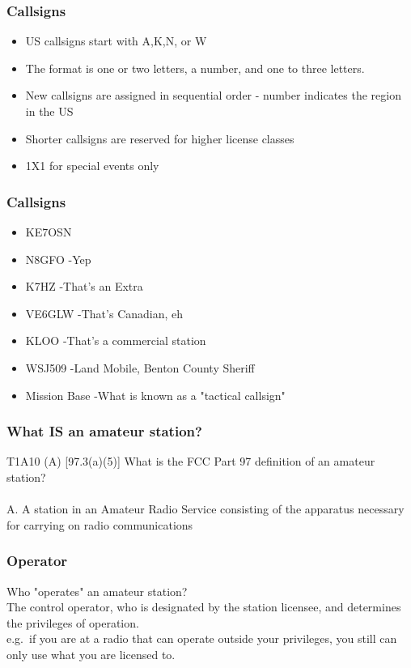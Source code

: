 \documentclass[10pt]{beamer}
\begin{document}
\begin{frame}
\frametitle{Callsigns}
\begin{itemize}
\item US callsigns start with A,K,N, or W
\item The format is one or two letters, a number, and one to three letters.
\item New callsigns are assigned in sequential order - number indicates the region in the US
\item Shorter callsigns are reserved for higher license classes
\item 1X1 for special events only
\end{itemize}
\end{frame}

\begin{frame}
\frametitle{Callsigns}
\begin{itemize}
\item KE7OSN
\item N8GFO \pause -Yep\pause
\item K7HZ \pause -That's an Extra\pause
\item VE6GLW \pause -That's Canadian, eh\pause
\item KLOO \pause -That's a commercial station\pause
\item WSJ509 \pause -Land Mobile, Benton County Sheriff\pause
\item Mission Base \pause -What is known as a "tactical callsign"\pause
\end{itemize}
\end{frame}

\begin{frame}
\frametitle{What IS an amateur station?}
T1A10 (A) [97.3(a)(5)] What is the FCC Part 97 definition of an amateur station?\\ \pause \hfil \\
A. A station in an Amateur Radio Service consisting of the apparatus necessary for carrying on radio
communications
\end{frame}

\begin{frame}
\frametitle{Operator}
Who "operates" an amateur station? \pause \\
The control operator, who is designated by the station licensee, and determines the privileges of operation.\\
e.g.\ if you are at a radio that can operate outside your privileges, you still can only use what you are licensed to.
\end{frame}
\end{document}
